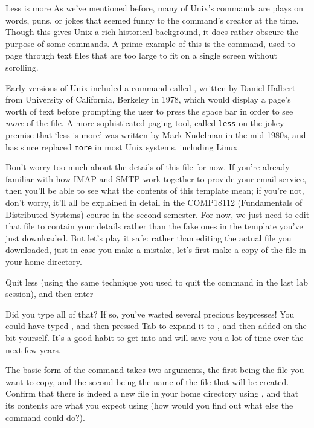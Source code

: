\begin{diversion}{Less is more}
\label{diversion:less}
As we've mentioned before, many of Unix's commands are plays on words, puns, or jokes that seemed funny to the command's creator at the time. Though this gives Unix a rich historical background, it does rather obscure the purpose of some commands. A prime example of this is the  command, used to page through text files that are too large to fit on a single screen without scrolling. 

Early versions of Unix included a command called , written by Daniel Halbert from University of California, Berkeley in 1978, which would display a page's worth of text before prompting the user to press the space bar in order to see \textit{more} of the file. A more sophisticated paging tool, called \texttt{less} on the jokey premise that `less is more' was written by Mark Nudelman in the mid 1980s, and has since replaced \texttt{more} in most Unix systems, including Linux. 
\end{diversion}

Don't worry too much about the details of this file for now. If you're already familiar with how IMAP and SMTP work together to provide your email service, then you'll be able to see what the contents of this template mean; if you're not, don't worry, it'll all be explained in detail in the COMP18112 (Fundamentals of Distributed Systems) course in the second semester. For now, we just need to edit that file to contain your details rather than the fake ones in the template you've just downloaded. But let's play it safe: rather than editing the actual file you downloaded, just in case you make a mistake, let's first make a copy of the file in your home directory. 


Quit less (using the same technique you used to quit the  command in the last lab session), and then enter


Did you type all of that? If so, you've wasted several precious keypresses! You could have typed , and then pressed Tab to expand it to , and then added on the  bit yourself. It's a good habit to get into and will save you a lot of time over the next few years.

The basic form of the  command takes two arguments, the first being the file you want to copy, and the second being the name of the file that will be created. Confirm that there is indeed a new file in your home directory using , and that its contents are what you expect using  (how would you find out what else the  command could do?). 

